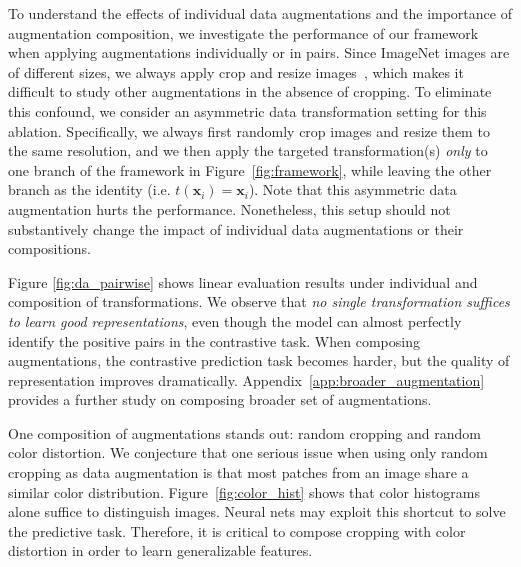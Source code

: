\documentclass{article}
\begin{document}
To understand the effects of individual data augmentations and the importance of augmentation composition, we investigate the performance of our framework when applying augmentations individually or in pairs.
Since ImageNet images are of different sizes, we always apply crop and resize images~\cite{krizhevsky2012imagenet,szegedy2015going}, which makes it difficult to study other augmentations in the absence of cropping. To eliminate this confound, we consider an asymmetric data transformation setting for this ablation. Specifically, we always first randomly crop images and resize them to the same resolution, and we then apply the targeted transformation(s) \textit{only} to one branch of the framework in Figure~\ref{fig:framework}, while leaving the other branch as the identity (i.e. $t(\bm x_i) = \bm x_i$). Note that this asymmetric data augmentation hurts the performance. Nonetheless, this setup should not substantively change the impact of individual data augmentations or their compositions.

Figure \ref{fig:da_pairwise} shows linear evaluation results under individual and composition of transformations. We observe that \textit{no single transformation suffices to learn good representations}, even though the model can almost perfectly identify the positive pairs in the contrastive task. When composing augmentations, the contrastive prediction task becomes harder, but the quality of representation improves dramatically. Appendix~\ref{app:broader_augmentation} provides a further study on composing broader set of augmentations.

One composition of augmentations stands out: random cropping and random color distortion. We conjecture that one serious issue when using only random cropping as data augmentation is that most patches from an image share a similar color distribution. Figure~\ref{fig:color_hist} shows that color histograms alone suffice to distinguish images. Neural nets may exploit this shortcut to solve the predictive task. Therefore, it is critical to compose cropping with color distortion in order to learn generalizable features. 
\end{document}
